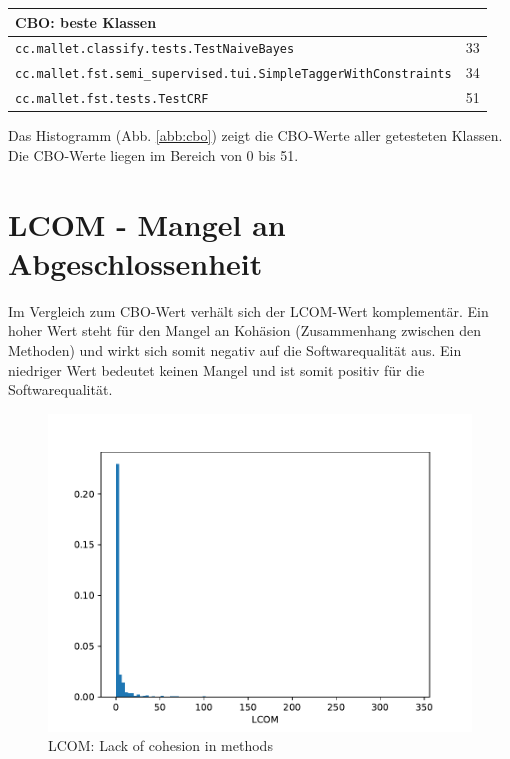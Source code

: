 \documentclass{scrreprt}
\newcommand{\lstx}[1]{\lstinline$#1$}
\begin{document}
\begin{center}
\begin{tabular}{ll}
\toprule
CBO: beste Klassen\\
\midrule
\lstx{cc.mallet.classify.tests.TestNaiveBayes} & 33 \\ 
\lstx{cc.mallet.fst.semi_supervised.tui.SimpleTaggerWithConstraints} & 34 \\
 \lstx{cc.mallet.fst.tests.TestCRF}& 51 \\
\bottomrule
\end{tabular}
\end{center}



Das Histogramm (Abb. \ref{abb:cbo}) zeigt die CBO-Werte aller getesteten Klassen. Die CBO-Werte liegen im Bereich von 0 bis 51.

\section{LCOM - Mangel an Abgeschlossenheit}

Im Vergleich zum CBO-Wert verhält sich der LCOM-Wert komplementär. Ein hoher Wert steht für den Mangel an Kohäsion (Zusammenhang zwischen den Methoden) und wirkt sich somit negativ auf die Softwarequalität aus.
Ein niedriger Wert bedeutet keinen Mangel und ist somit positiv für die Softwarequalität.

\begin{figure}
 \centering
 \includegraphics[width=.8\textwidth]{./LCOM.pdf}
 \caption{LCOM: Lack of cohesion in methods}
 \label{abb:lcom}
\end{figure}


\begin{center}
\end{center}
\end{document}

